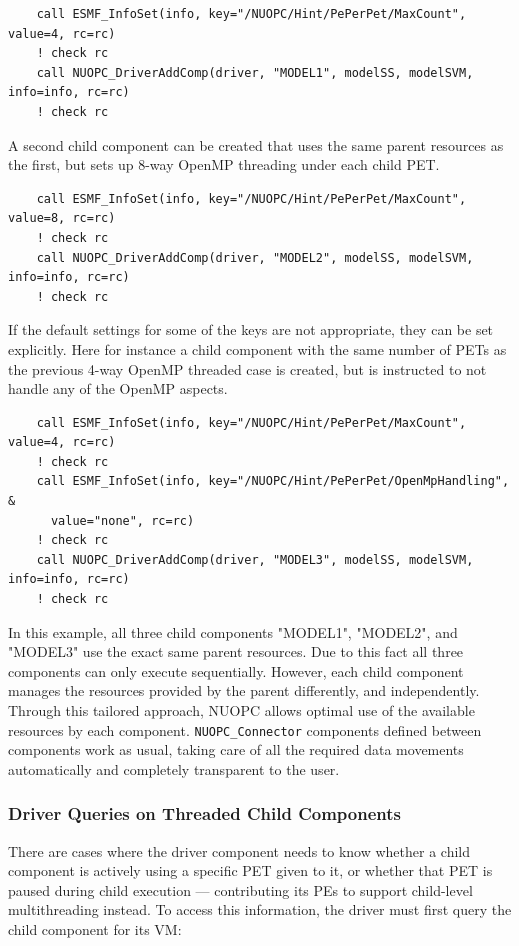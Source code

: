 \begin{verbatim}
    call ESMF_InfoSet(info, key="/NUOPC/Hint/PePerPet/MaxCount", value=4, rc=rc)
    ! check rc
    call NUOPC_DriverAddComp(driver, "MODEL1", modelSS, modelSVM, info=info, rc=rc)
    ! check rc
\end{verbatim}

A second child component can be created that uses the same parent resources as the first, but sets up 8-way OpenMP threading under each child PET.

\begin{verbatim}
    call ESMF_InfoSet(info, key="/NUOPC/Hint/PePerPet/MaxCount", value=8, rc=rc)
    ! check rc
    call NUOPC_DriverAddComp(driver, "MODEL2", modelSS, modelSVM, info=info, rc=rc)
    ! check rc
\end{verbatim}

If the default settings for some of the keys are not appropriate, they can be set explicitly. Here for instance a child component with the same number of PETs as the previous 4-way OpenMP threaded case is created, but is instructed to not handle any of the OpenMP aspects.

\begin{verbatim}
    call ESMF_InfoSet(info, key="/NUOPC/Hint/PePerPet/MaxCount", value=4, rc=rc)
    ! check rc
    call ESMF_InfoSet(info, key="/NUOPC/Hint/PePerPet/OpenMpHandling", &
      value="none", rc=rc)
    ! check rc
    call NUOPC_DriverAddComp(driver, "MODEL3", modelSS, modelSVM, info=info, rc=rc)
    ! check rc
\end{verbatim}

In this example, all three child components "MODEL1", "MODEL2", and "MODEL3" use the exact same parent resources. Due to this fact all three components can only execute sequentially. However, each child component manages the resources provided by the parent differently, and independently. Through this tailored approach, NUOPC allows optimal use of the available resources by each component. {\tt NUOPC\_Connector} components defined between components work as usual, taking care of all the required data movements automatically and completely transparent to the user.

\subsubsection{Driver Queries on Threaded Child Components}

There are cases where the driver component needs to know whether a child component is actively using a specific PET given to it, or whether that PET is paused during child execution --- contributing its PEs to support child-level multithreading instead. To access this information, the driver must first query the child component for its VM:

